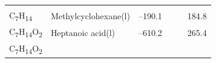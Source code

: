 \documentclass[
  9pt,
]{extbook}
\theoremstyle{definition}
\theoremstyle{definition}
\theoremstyle{definition}
\theoremstyle{remark}
\begin{document}
\begin{longtable}[]{@{}llllll@{}}
\begin{minipage}[t]{0.15\columnwidth}
\strut
\end{minipage} & \begin{minipage}[t]{0.14\columnwidth}\raggedright
\strut
\end{minipage} & \begin{minipage}[t]{0.14\columnwidth}\raggedright
\strut
\end{minipage}\tabularnewline
\begin{minipage}[t]{0.07\columnwidth}\raggedright
C\textsubscript{7}H\textsubscript{14}\strut
\end{minipage} & \begin{minipage}[t]{0.17\columnwidth}\raggedright
Methylcyclohexane(l)\strut
\end{minipage} & \begin{minipage}[t]{0.15\columnwidth}\raggedright
--190.1\strut
\end{minipage} & \begin{minipage}[t]{0.15\columnwidth}\raggedright
\strut
\end{minipage} & \begin{minipage}[t]{0.14\columnwidth}\raggedright
\strut
\end{minipage} & \begin{minipage}[t]{0.14\columnwidth}\raggedright
184.8\strut
\end{minipage}\tabularnewline
\begin{minipage}[t]{0.07\columnwidth}\raggedright
C\textsubscript{7}H\textsubscript{14}O\textsubscript{2}\strut
\end{minipage} & \begin{minipage}[t]{0.17\columnwidth}\raggedright
Heptanoic acid(l)\strut
\end{minipage} & \begin{minipage}[t]{0.15\columnwidth}\raggedright
--610.2\strut
\end{minipage} & \begin{minipage}[t]{0.15\columnwidth}\raggedright
\strut
\end{minipage} & \begin{minipage}[t]{0.14\columnwidth}\raggedright
\strut
\end{minipage} & \begin{minipage}[t]{0.14\columnwidth}\raggedright
265.4\strut
\end{minipage}\tabularnewline
\begin{minipage}[t]{0.07\columnwidth}\raggedright
C\textsubscript{7}H\textsubscript{14}O\textsubscript{2}\strut
\end{minipage} & \begin{minipage}[t]{0.17\columnwidth}\raggedright

\end{minipage}
\end{longtable}
\end{document}
